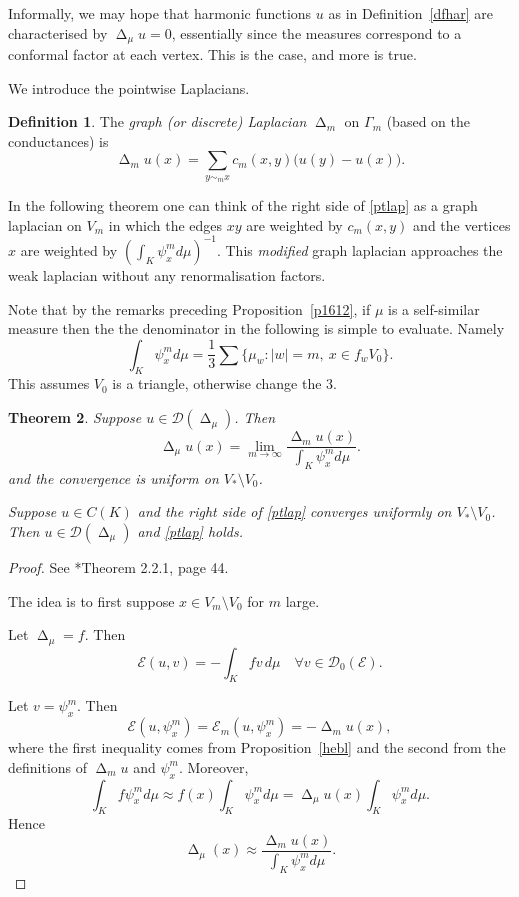 \documentclass[a4paper]{amsart}
\theoremstyle{plain}
\newtheorem{theorem}{Theorem}[section]
\theoremstyle{definition}
\newtheorem{definition}[theorem]{Definition}%
\theoremstyle{remark}
\DeclareMathOperator{\lap}{\Delta}
\begin{document}
Informally, we may hope that harmonic functions $ u $ as in Definition~\ref{dfhar} are characterised by $ \lap_\mu u = 0 $, essentially since the measures correspond to a conformal factor at each vertex. 
This is the case, and more is true.

We introduce the pointwise Laplacians.

\begin{definition} \label{dfdl} The \emph{graph (or discrete) Laplacian} $ \lap_m $ on $ \Gamma_m $  (based on the conductances) is 
\begin{equation} \label{}
\lap_m u(x) = \sum_{y\sim_m x} c_m(x,y) \big(u(y) - u(x)\big).
\end{equation}
\end{definition}  

In the following theorem one can think of the right side of \eqref{ptlap} as a graph laplacian on $ V_m $ in which the edges $ xy $ are weighted by   $ c_m(x,y) $ and the vertices $ x $ are weighted by $  \left(\int_K \psi_x^m d\mu \right)^{-1}$.  This  \emph{modified} graph laplacian approaches the weak laplacian without any renormalisation factors. 

 Note that by the remarks preceding Proposition~\ref{p1612}, if $ \mu $ is a self-similar measure then the the denominator in the following  is simple to evaluate.  Namely
 \[
 \int_K \psi_x^m d\mu = \frac{1}{3} \sum \{ \mu_w: |w|=m,\ x \in f_w V_0 \}.
 \]
This assumes $ V_0 $ is a triangle, otherwise change the $ 3 $.
 
 
 

\begin{theorem} \label{wlll}
Suppose $ u \in \mathcal{D}  (\lap_\mu )$.  Then 
\begin{equation} \label{ptlap} 
\lap_\mu u(x) = \lim_{m\to \infty}  \frac{\lap_m u(x)} { \int_K \psi_x^m d\mu}.
\end{equation} 
and the convergence is uniform on $ V_*\setminus V_0 $.

Suppose $ u \in C(K) $ and  the right side of \eqref{ptlap} converges uniformly   on $ V_* \setminus V_0 $.  Then $ u \in \mathcal{D} (\lap_\mu) $ and \eqref{ptlap} holds.
\end{theorem}    

\begin{proof} See \cite{Str}*{Theorem 2.2.1, page 44}.

The idea is to first suppose $ x \in V_m \setminus V_0$ for $ m $ large.

Let $ \lap_\mu = f  $.  Then
\[
\mathcal{E} (u, v) = - \int_K fv\, d\mu \quad \forall   v \in \mathcal{D} _0 ( \mathcal{E} ) .
\]

Let  $ v = \psi^m_x $.  Then 
\[
\mathcal{E} (u, \psi_x^m) = \mathcal{E} _m (u, \psi_x^m) = - \lap_m u(x) ,
\]
where the first inequality comes from Proposition~\ref{hebl} and the second from the definitions of $ \lap_m u$ and $ \psi^m_x $.
Moreover,
\[
\int_K f \psi_x^m d\mu \approx f(x) \int_K \psi_x^m d\mu = \lap_\mu u(x) \int_K \psi_x^m d\mu.
\]
Hence
\[
\lap_\mu(x) \approx \frac{ \lap_m u(x) } {\int_K \psi_x^m d\mu }.
\]
\end{proof} 
\end{document}
